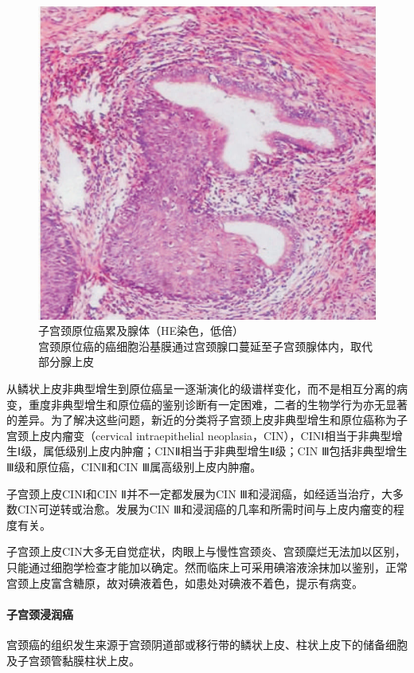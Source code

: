 \begin{figure}[!htbp]
 \centering
 \includegraphics{./images/Image00186.jpg}
 \captionsetup{justification=centering}
 \caption{子宫颈原位癌累及腺体（HE染色，低倍）\\{\small 宫颈原位癌的癌细胞沿基膜通过宫颈腺口蔓延至子宫颈腺体内，取代部分腺上皮}}
 \label{fig11-2}
  \end{figure} 

从鳞状上皮非典型增生到原位癌呈一逐渐演化的级谱样变化，而不是相互分离的病变，重度非典型增生和原位癌的鉴别诊断有一定困难，二者的生物学行为亦无显著的差异。为了解决这些问题，新近的分类将子宫颈上皮非典型增生和原位癌称为子宫颈上皮内瘤变（cervical
intraepithelial
neoplasia，CIN），CINⅠ相当于非典型增生Ⅰ级，属低级别上皮内肿瘤；CINⅡ相当于非典型增生Ⅱ级；CIN
Ⅲ包括非典型增生Ⅲ级和原位癌，CINⅡ和CIN Ⅲ属高级别上皮内肿瘤。

子宫颈上皮CINⅠ和CIN Ⅱ并不一定都发展为CIN
Ⅲ和浸润癌，如经适当治疗，大多数CIN可逆转或治愈。发展为CIN
Ⅲ和浸润癌的几率和所需时间与上皮内瘤变的程度有关。

子宫颈上皮CIN大多无自觉症状，肉眼上与慢性宫颈炎、宫颈糜烂无法加以区别，只能通过细胞学检查才能加以确定。然而临床上可采用碘溶液涂抹加以鉴别，正常宫颈上皮富含糖原，故对碘液着色，如患处对碘液不着色，提示有病变。

\paragraph{子宫颈浸润癌}
宫颈癌的组织发生来源于宫颈阴道部或移行带的鳞状上皮、柱状上皮下的储备细胞及子宫颈管黏膜柱状上皮。

